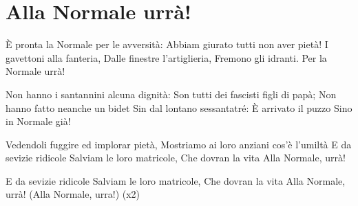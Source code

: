 \section{Alla Normale urrà!}
\subtitle{Sulla melodia di “When Johnny comes marching home”}
\begin{canzone}
È pronta la Normale per le avversità:
Abbiam giurato tutti non aver pietà!
I gavettoni alla fanteria,
Dalle finestre l’artiglieria,
Fremono gli idranti.
Per la Normale urrà!

Non hanno i santannini alcuna dignità:
Son tutti dei fascisti figli di papà;
Non hanno fatto neanche un bidet
Sin dal lontano sessantatré:
È arrivato il puzzo
Sino in Normale già!

Vedendoli fuggire ed implorar pietà,
Mostriamo ai loro anziani cos’è l’umiltà
E da sevizie ridicole
Salviam le loro matricole,
Che dovran la vita
Alla Normale, urrà!

E da sevizie ridicole
Salviam le loro matricole,
Che dovran la vita
Alla Normale, urrà!
(Alla Normale, urra!) (x2)
\end{canzone}
